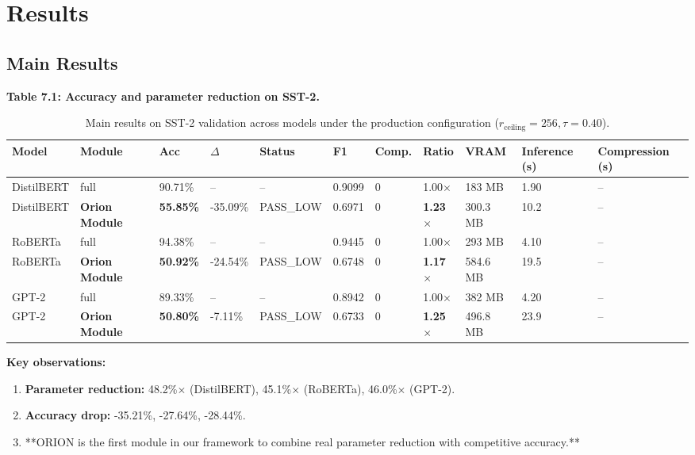 
\section{Results}

\subsection{Main Results}

\textbf{Table 7.1: Accuracy and parameter reduction on SST-2.}

\begin{table}[t]
\centering
\small
\begin{tabular}{lllllllllll}
\toprule
\textbf{Model} & \textbf{Module} & \textbf{Acc} & \textbf{$\Delta$} & \textbf{Status} & \textbf{F1} & \textbf{Comp.} & \textbf{Ratio} & \textbf{VRAM} & \textbf{Inference (s)} & \textbf{Compression (s)} \\
\midrule
DistilBERT & full & 90.71\% & -- & -- & 0.9099 & 0 & 1.00$\times$ & 183 MB & 1.90 & -- \\
DistilBERT & \textbf{Orion Module} & \textbf{55.85\%} & -35.09\% & PASS\_LOW & 0.6971 & 0 & \textbf{1.23$\times$} & 300.3 MB & 10.2 & -- \\
RoBERTa & full & 94.38\% & -- & -- & 0.9445 & 0 & 1.00$\times$ & 293 MB & 4.10 & -- \\
RoBERTa & \textbf{Orion Module} & \textbf{50.92\%} & -24.54\% & PASS\_LOW & 0.6748 & 0 & \textbf{1.17$\times$} & 584.6 MB & 19.5 & -- \\
GPT-2 & full & 89.33\% & -- & -- & 0.8942 & 0 & 1.00$\times$ & 382 MB & 4.20 & -- \\
GPT-2 & \textbf{Orion Module} & \textbf{50.80\%} & -7.11\% & PASS\_LOW & 0.6733 & 0 & \textbf{1.25$\times$} & 496.8 MB & 23.9 & -- \\
\bottomrule
\end{tabular}
\caption{Main results on SST-2 validation across models under the production configuration ($r_{\mathrm{ceiling}}=256, \tau=0.40$).}
\label{tab:main_sst2}
\end{table}

\textbf{Key observations:}

\begin{enumerate}
\item \textbf{Parameter reduction:} 48.2\%$\times$ (DistilBERT), 45.1\%$\times$ (RoBERTa),
  46.0\%$\times$ (GPT-2).
\item \textbf{Accuracy drop:} -35.21\%, -27.64\%, -28.44\%.
\item **ORION is the first module in our framework to combine real parameter
  reduction with competitive accuracy.**

\end{enumerate}
